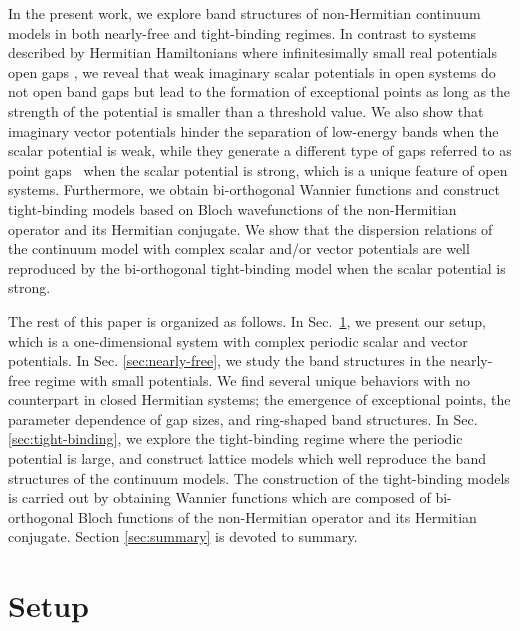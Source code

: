 \documentclass[prb,superscriptaddress,floatfix,twocolumn,showpacs]{revtex4-2}
\begin{document}
In the present work, we explore band structures of non-Hermitian continuum models in both nearly-free and tight-binding regimes.
In contrast to systems described by Hermitian Hamiltonians where infinitesimally small real potentials open gaps \cite{ashcroft1976solid}, we reveal that weak imaginary scalar potentials in open systems do not open band gaps but lead to the formation of exceptional points as long as the strength of the potential is smaller than a threshold value. 
We also show that imaginary vector potentials hinder the separation of low-energy bands when the scalar potential is weak, while they generate a different type of gaps referred to as point gaps~\cite{kawabata2019symmetry} when the scalar potential is strong, which is a unique feature of open systems. 
Furthermore, we obtain bi-orthogonal Wannier functions and construct tight-binding models based on Bloch wavefunctions of the non-Hermitian operator and its Hermitian conjugate. 
We show that the dispersion relations of the continuum model with complex scalar and/or vector potentials are well reproduced by the bi-orthogonal tight-binding model when the scalar potential is strong. 

The rest of this paper is organized as follows.
In Sec.~\ref{sec:setup}, we present our setup, which is a one-dimensional system with complex periodic scalar and vector potentials.
In Sec. \ref{sec:nearly-free}, we study the band structures in the nearly-free regime with small potentials. 
We find several unique behaviors with no counterpart in closed Hermitian systems; the emergence of exceptional points, the parameter dependence of gap sizes, and ring-shaped band structures.
In Sec. \ref{sec:tight-binding}, we explore the tight-binding regime where the periodic potential is large, and construct lattice models which well reproduce the band structures of the continuum models. 
The construction of the tight-binding models is carried out by obtaining Wannier functions which are composed of  bi-orthogonal Bloch functions of the non-Hermitian operator and its Hermitian conjugate. 
Section \ref{sec:summary} is devoted to summary.

\section{Setup}
\label{sec:setup}
\end{document}
